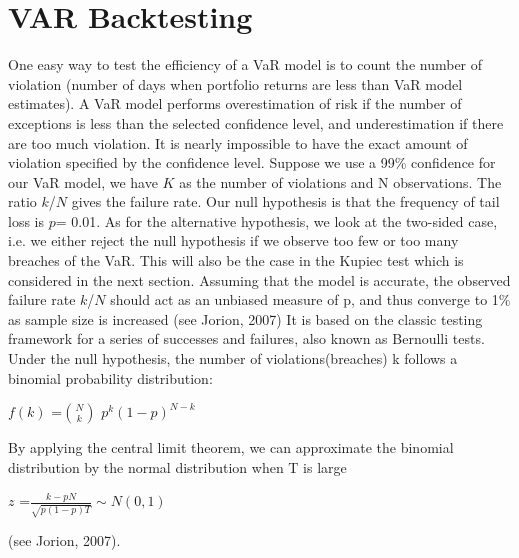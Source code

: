 \documentclass[a4paper,11pt,oneside]{book}
\begin{document}
\section{VAR Backtesting}\label{vio}
One easy way to test the efficiency of a VaR model is to count the number of violation (number of days when portfolio returns are less than VaR model estimates). A VaR model performs overestimation of risk if the number of exceptions is less than the selected confidence level, and underestimation if there are too much violation. It is nearly impossible to have the exact amount of violation specified by the confidence level.\newline\newline
Suppose we use a 99\% confidence for our VaR model, we have $K$ as the number of violations and N observations. The ratio $k$/$N$ gives the failure rate. Our null hypothesis is that the frequency of tail loss is $p$= 0.01. As for the alternative hypothesis, we look at the two-sided case, i.e. we either reject the null hypothesis if we observe too few or too many breaches of the VaR. This will also be the case in the Kupiec test which is considered in the next section.  Assuming that the model is accurate, the observed failure rate $k$/$N$
should act as an unbiased measure of p, and thus converge to 1\% as sample size is
increased (see Jorion, 2007) \newline\newline
It is based on the classic testing framework for a series of successes and failures, also known as Bernoulli tests. Under the null hypothesis, the number of violations(breaches) k follows a binomial probability distribution:
\begin{center}
	$f(k)$ =$N \choose {k}$ $p^{k}(1-p)^{N-k}$ 
\end{center}

By applying the central limit theorem, we can approximate the binomial distribution by the normal distribution when T is large
\begin{center}
	$z$ =$\frac{k-pN}{\sqrt{p(1-p)T}}\sim N(0,1)$ 
\end{center}
(see Jorion, 2007).
\end{document}
